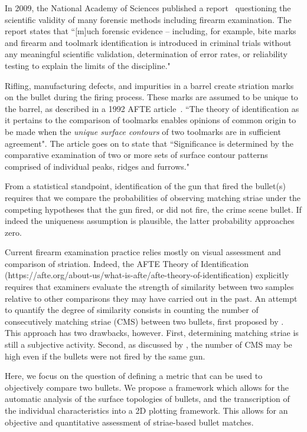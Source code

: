 \documentclass[aoas, preprint]{imsart}\usepackage[]{graphicx}\usepackage[]{color}
\begin{document}
In 2009, the National Academy of Sciences published a report~\citep{NAS:2009} questioning the scientific validity of many forensic methods including firearm examination. The report states that ``[m]uch forensic evidence -- including, for example, bite marks and firearm and toolmark identification is introduced in criminal trials without any meaningful scientific validation, determination of error rates, or reliability testing to explain the limits of the discipline."

Rifling, manufacturing defects, and impurities in a barrel create striation marks on the bullet during the firing process. These marks are assumed to be unique to the barrel, as described in a 1992 AFTE article~\citep{afte:1992}. ``The theory of identification as it pertains to the comparison of toolmarks enables opinions of common origin to be made when the \emph{unique surface contours} of two toolmarks are in sufficient agreement". The article goes on to state that ``Significance is determined by the comparative examination of two or more sets of surface contour patterns comprised of individual peaks, ridges and furrows."

From a statistical standpoint, identification of the gun that fired the bullet(s) requires that we compare the probabilities of observing matching striae under the competing hypotheses that the gun fired, or did not fire, the crime scene bullet. If indeed the uniqueness assumption is plausible, the latter probability approaches zero.

Current firearm examination practice relies mostly on visual assessment and comparison of striation. Indeed, the AFTE Theory of Identification (https://afte.org/about-us/what-is-afte/afte-theory-of-identification) explicitly requires that examiners evaluate the strength of similarity between two samples relative to other comparisons they may have carried out in the past. An attempt to quantify the degree of similarity consists in counting the number of consecutively matching striae (CMS) between two bullets, first proposed by \citet{biasotti:1959}. This approach has two drawbacks, however. First, determining matching striae is still a subjective activity. Second, as discussed by \citet{miller:1998}, the number of CMS may be high even if the bullets were not fired by the same gun.

Here, we focus on the question of defining a metric that can be used to objectively compare two bullets. We propose a framework which allows for the automatic analysis of the surface topologies of bullets, and the transcription of the individual characteristics into a 2D plotting framework. 
This allows for an objective and quantitative assessment of striae-based bullet matches.
\end{document}
